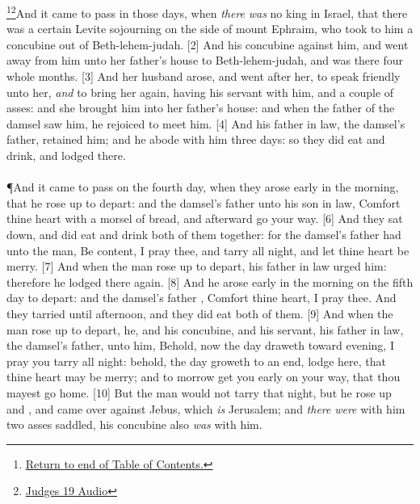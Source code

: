 \footnote{\textcolor[cmyk]{0.99998,1,0,0}{\hyperlink{TOC}{Return to end of Table of Contents.}}}\footnote{\href{https://audiobible.com/bible/judges_19.html}{\textcolor[cmyk]{0.99998,1,0,0}{Judges 19 Audio}}}\textcolor[cmyk]{0.99998,1,0,0}{And it came to pass in those days, when \emph{there} \emph{was} no king in Israel, that there was a certain Levite sojourning on the side of mount Ephraim, who took to him a concubine out of Beth-lehem-judah.}
[2] \textcolor[cmyk]{0.99998,1,0,0}{And his concubine  against him, and went away from him unto her father's house to Beth-lehem-judah, and was there four whole months.}
[3] \textcolor[cmyk]{0.99998,1,0,0}{And her husband arose, and went after her, to speak friendly unto her, \emph{and} to bring her again, having his servant with him, and a couple of asses: and she brought him into her father's house: and when the father of the damsel saw him, he rejoiced to meet him.}
[4] \textcolor[cmyk]{0.99998,1,0,0}{And his father in law, the damsel's father, retained him; and he abode with him three days: so they did eat and drink, and lodged there.}\\
\\
\P \textcolor[cmyk]{0.99998,1,0,0}{And it came to pass on the fourth day, when they arose early in the morning, that he rose up to depart: and the damsel's father   unto his son in law, Comfort thine heart with a morsel of bread, and afterward go your way.}
[6] \textcolor[cmyk]{0.99998,1,0,0}{And they sat down, and did eat and drink both of them together: for the damsel's father had   unto the man, Be content, I pray thee, and tarry all night, and let thine heart be merry.}
[7] \textcolor[cmyk]{0.99998,1,0,0}{And when the man rose up to depart, his father in law urged him: therefore he lodged there again.}
[8] \textcolor[cmyk]{0.99998,1,0,0}{And he arose early in the morning on the fifth day to depart: and the damsel's father  , Comfort thine heart, I pray thee. And they tarried until afternoon, and they did eat both of them.}
[9] \textcolor[cmyk]{0.99998,1,0,0}{And when the man rose up to depart, he, and his concubine, and his servant, his father in law, the damsel's father,   unto him, Behold, now the day draweth toward evening, I pray you tarry all night: behold, the day groweth to an end, lodge here, that thine heart may be merry; and to morrow get you early on your way, that thou mayest go home.}
[10] \textcolor[cmyk]{0.99998,1,0,0}{But the man would not tarry that night, but he rose up and , and came over against Jebus, which \emph{is} Jerusalem; and \emph{there} \emph{were} with him two asses saddled, his concubine also \emph{was} with him.}
